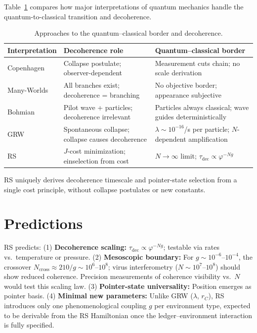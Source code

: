\documentclass[12pt,a4paper]{article}
\theoremstyle{definition}
\theoremstyle{remark}
\begin{document}
Table~\ref{tab:interpretations} compares how major interpretations of
quantum mechanics handle the quantum-to-classical transition and
decoherence.

\begin{table}[htbp]
\centering
\caption{Approaches to the quantum--classical border and decoherence.}
\label{tab:interpretations}
\begin{tabular}{@{}lp{4cm}p{4cm}@{}}
\toprule
Interpretation & Decoherence role & Quantum--classical border \\
\midrule
Copenhagen & \parbox[t]{4cm}{Collapse postulate; observer-dependent} & \parbox[t]{4cm}{Measurement cuts chain; no scale derivation} \\
Many-Worlds & \parbox[t]{4cm}{All branches exist; decoherence = branching} & \parbox[t]{4cm}{No objective border; appearance subjective} \\
Bohmian & \parbox[t]{4cm}{Pilot wave + particles; decoherence irrelevant} & \parbox[t]{4cm}{Particles always classical; wave guides deterministically} \\
GRW & \parbox[t]{4cm}{Spontaneous collapse; collapse causes decoherence} & \parbox[t]{4cm}{$\lambda \sim 10^{-16}$/s per particle; $N$-dependent amplification} \\
RS & \parbox[t]{4cm}{$J$-cost minimization; einselection from cost} & \parbox[t]{4cm}{$N \to \infty$ limit; $\tau_{\mathrm{dec}} \propto \varphi^{-Ng}$} \\
\bottomrule
\end{tabular}
\end{table}

RS uniquely derives decoherence timescale and pointer-state selection
from a single cost principle, without collapse postulates or new constants.

\section{Predictions}

RS predicts: (1) \textbf{Decoherence scaling:}
$\tau_{\mathrm{dec}} \propto \varphi^{-Ng}$; testable via rates vs.\
temperature or pressure.  (2) \textbf{Mesoscopic boundary:} For
$g \sim 10^{-6}$--$10^{-4}$, the crossover
$N_{\mathrm{cross}} \approx 210/g \sim 10^6$--$10^8$; virus
interferometry ($N \sim 10^7$--$10^8$) should show reduced
coherence.  Precision measurements of coherence visibility vs.\ $N$
would test this scaling law.  (3) \textbf{Pointer-state universality:}
Position emerges as pointer basis.  (4) \textbf{Minimal new parameters:}
Unlike GRW ($\lambda$, $r_C$), RS introduces only one phenomenological
coupling $g$ per environment type, expected to be derivable from the
RS Hamiltonian once the ledger--environment interaction is fully
specified.
\end{document}
